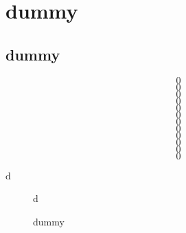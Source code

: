 \documentclass[11pt,a4paper]{article}
\begin{document}
\section{dummy}\label{sec:hys-gap}
\subsection{dummy}\label{sec:sum-staging}
\begin{equation}\label{eq:dUhys}0\end{equation}
\begin{equation}\label{eq:lco-dope}0\end{equation}
\begin{equation}\label{eq:Ubranch}0\end{equation}
\begin{equation}\label{eq:Acut}0\end{equation}
\begin{equation}\label{eq:chid}0\end{equation}
\begin{equation}\label{eq:dHeff}0\end{equation}
\begin{equation}\label{eq:Lqfull}0\end{equation}
\begin{equation}\label{eq:LV}0\end{equation}
\begin{equation}\label{eq:tail-limit}0\end{equation}
\begin{equation}\label{eq:lag}0\end{equation}
\begin{equation}\label{eq:Lq}0\end{equation}
\begin{equation}\label{eq:peakshape}0\end{equation}
\begin{table}[h]\caption{dummy}\label{tab:staging}\centering d\end{table}
\begin{figure}[h]\caption{dummy}\label{fig:hysloop}\centering d\end{figure}
\clearpage

\clearpage

\clearpage

\end{document}
